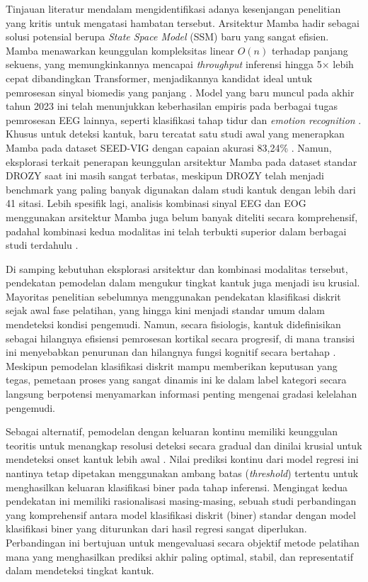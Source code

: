     Tinjauan literatur mendalam mengidentifikasi adanya kesenjangan penelitian yang kritis untuk mengatasi hambatan tersebut. Arsitektur Mamba hadir sebagai solusi potensial berupa \textit{State Space Model} (SSM) baru yang sangat efisien. Mamba menawarkan keunggulan kompleksitas linear $O(n)$ terhadap panjang sekuens, yang memungkinkannya mencapai \textit{throughput} inferensi hingga 5× lebih cepat dibandingkan Transformer, menjadikannya kandidat ideal untuk pemrosesan sinyal biomedis yang panjang \cite{Gu2023}. Model yang baru muncul pada akhir tahun 2023 ini telah menunjukkan keberhasilan empiris pada berbagai tugas pemrosesan EEG lainnya, seperti klasifikasi tahap tidur \cite{Zhou2025} dan \textit{emotion recognition} \cite{Chen2023FACED}. Khusus untuk deteksi kantuk, baru tercatat satu studi awal yang menerapkan Mamba pada dataset SEED-VIG dengan capaian akurasi 83,24\% \cite{Siddhad2024}. Namun, eksplorasi terkait penerapan keunggulan arsitektur Mamba pada dataset standar DROZY saat ini masih sangat terbatas, meskipun DROZY telah menjadi benchmark yang paling banyak digunakan dalam studi kantuk dengan lebih dari 41 sitasi. Lebih spesifik lagi, analisis kombinasi sinyal EEG dan EOG menggunakan arsitektur Mamba juga belum banyak diteliti secara komprehensif, padahal kombinasi kedua modalitas ini telah terbukti superior dalam berbagai studi terdahulu \cite{Sommer2015}.

	Di samping kebutuhan eksplorasi arsitektur dan kombinasi modalitas tersebut, pendekatan pemodelan dalam mengukur tingkat kantuk juga menjadi isu krusial. Mayoritas penelitian sebelumnya menggunakan pendekatan klasifikasi diskrit sejak awal fase pelatihan, yang hingga kini menjadi standar umum dalam mendeteksi kondisi pengemudi. Namun, secara fisiologis, kantuk didefinisikan sebagai hilangnya efisiensi pemrosesan kortikal secara progresif, di mana transisi ini menyebabkan penurunan dan hilangnya fungsi kognitif secara bertahap \cite{slater2008definition}. Meskipun pemodelan klasifikasi diskrit mampu memberikan keputusan yang tegas, pemetaan proses yang sangat dinamis ini ke dalam label kategori secara langsung berpotensi menyamarkan informasi penting mengenai gradasi kelelahan pengemudi. 

	Sebagai alternatif, pemodelan dengan keluaran kontinu memiliki keunggulan teoritis untuk menangkap resolusi deteksi secara gradual dan dinilai krusial untuk mendeteksi onset kantuk lebih awal \cite{Wang2022}. Nilai prediksi kontinu dari model regresi ini nantinya tetap dipetakan menggunakan ambang batas (\textit{threshold}) tertentu untuk menghasilkan keluaran klasifikasi biner pada tahap inferensi. Mengingat kedua pendekatan ini memiliki rasionalisasi masing-masing, sebuah studi perbandingan yang komprehensif antara model klasifikasi diskrit (biner) standar dengan model klasifikasi biner yang diturunkan dari hasil regresi sangat diperlukan. Perbandingan ini bertujuan untuk mengevaluasi secara objektif metode pelatihan mana yang menghasilkan prediksi akhir paling optimal, stabil, dan representatif dalam mendeteksi tingkat kantuk.

